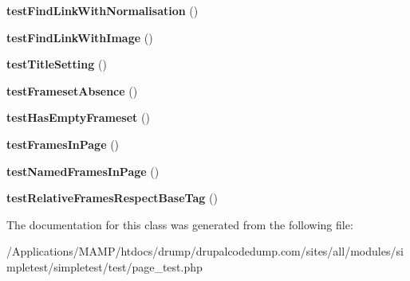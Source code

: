 \begin{DoxyCompactItemize}
\item 
\hypertarget{class_test_of_html_page_a84fc603d18429c638e100fa6ce4a2fdf}{
{\bfseries testFindLinkWithNormalisation} ()}
\label{class_test_of_html_page_a84fc603d18429c638e100fa6ce4a2fdf}

\item 
\hypertarget{class_test_of_html_page_a58bcb238897218bf35d0adafe47c045c}{
{\bfseries testFindLinkWithImage} ()}
\label{class_test_of_html_page_a58bcb238897218bf35d0adafe47c045c}

\item 
\hypertarget{class_test_of_html_page_a9fdfb36c3387a958218bd7c8509240d0}{
{\bfseries testTitleSetting} ()}
\label{class_test_of_html_page_a9fdfb36c3387a958218bd7c8509240d0}

\item 
\hypertarget{class_test_of_html_page_a804fd9cb0310e29218b7a880aab7eb5d}{
{\bfseries testFramesetAbsence} ()}
\label{class_test_of_html_page_a804fd9cb0310e29218b7a880aab7eb5d}

\item 
\hypertarget{class_test_of_html_page_a0c5d2ed0e8b4bdfbb9612100f32d24e7}{
{\bfseries testHasEmptyFrameset} ()}
\label{class_test_of_html_page_a0c5d2ed0e8b4bdfbb9612100f32d24e7}

\item 
\hypertarget{class_test_of_html_page_aaab6047119fff9b46fa3e4af51197506}{
{\bfseries testFramesInPage} ()}
\label{class_test_of_html_page_aaab6047119fff9b46fa3e4af51197506}

\item 
\hypertarget{class_test_of_html_page_a8fd4f2c7dbc668a5f2d673134eb691a8}{
{\bfseries testNamedFramesInPage} ()}
\label{class_test_of_html_page_a8fd4f2c7dbc668a5f2d673134eb691a8}

\item 
\hypertarget{class_test_of_html_page_a05f0f8f14a4ed73da1b526fd278588db}{
{\bfseries testRelativeFramesRespectBaseTag} ()}
\label{class_test_of_html_page_a05f0f8f14a4ed73da1b526fd278588db}

\end{DoxyCompactItemize}


The documentation for this class was generated from the following file:\begin{DoxyCompactItemize}
\item 
/Applications/MAMP/htdocs/drump/drupalcodedump.com/sites/all/modules/simpletest/simpletest/test/page\_\-test.php\end{DoxyCompactItemize}
